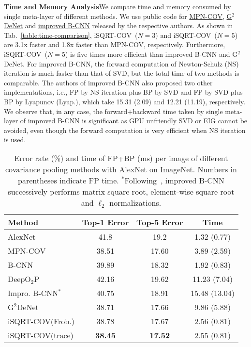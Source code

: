 \documentclass[10pt,twocolumn,letterpaper]{article}
\begin{document}
\vspace{4pt}\noindent\textbf{Time and Memory Analysis}\quad We  compare  time and memory consumed by  single meta-layer of different methods. We use  public code for \href{https://github.com/jiangtaoxie/MPN-COV-ConvNet}{MPN-COV},  \href{http://www.peihuali.org/publications/G2DeNet/G2DeNet-FGVC-v1.0.zip}{G$^{2}$DeNet} and \href{https://bitbucket.org/tsungyu/bcnn}{improved B-CNN} released by the respective authors. As shown in Tab.~\ref{table:time-comparison}, iSQRT-COV~($N=3$) and iSQRT-COV~($N=5$) are 3.1x faster and 1.8x faster than MPN-COV, respectively. Furthermore, iSQRT-COV~($N=5$) is  five  times more efficient than  improved B-CNN and G$^2$DeNet. For improved B-CNN, the forward computation of Newton-Schulz (NS) iteration is much faster than that of SVD, but the total time of two methods is comparable. The authors of improved B-CNN  also proposed two other implementations, i.e.,  FP by NS iteration plus BP by SVD and FP by SVD plus BP by Lyapunov (Lyap.), which take 15.31 (2.09) and 12.21 (11.19), respectively. We observe that, in any case, the forward$+$backward time taken by  single meta-layer of improved B-CNN is significant  as GPU unfriendly SVD or EIG cannot be avoided, even though the forward computation is very  efficient when NS iteration is used. 
\begin{table}[t]
\setlength\tabcolsep{4pt}
	\renewcommand{\baselinestretch}{1.05}
\footnotesize
	\centering
\begin{minipage}[t]{1.0\linewidth}
		\centering
		\begin{tabular}{|l|c|c|c|}
			\hline
			Method & Top-1 Error   &  Top-5 Error  & Time \\
			\hline
			\hline
			AlexNet~\cite{Krizhevsky2012ImageNet}       &  41.8     & 19.2  &  1.32 (0.77) \\
			\hline
			MPN-COV~\cite{Li_2017_ICCV}                           &  38.51 & 17.60 & 3.89 (2.59)\\
			B-CNN~\cite{lin2015bilinear}          &  39.89 & 18.32 & 1.92 (0.83)\\
			DeepO$_{2}$P~\cite{Ionescu_2015_ICCV} &  42.16 & 19.62  & 11.23 (7.04)\\
			Impro. B-CNN$^{*}$\cite{lin2017improved}     & 40.75         &  18.91  &  15.48 (13.04)  \\
			G$^2$DeNet~\cite{Wang_2017_CVPR}      &    38.71      & 17.66     &  9.86 (5.88) \\
			\hline
			\hline
			iSQRT-COV(Frob.)   &  38.78 &  17.67  & 2.56 (0.81)\\
			iSQRT-COV(trace) &  \textbf{38.45} &  \textbf{17.52} & 2.55 (0.81) \\
			\hline
		\end{tabular}
	\end{minipage}
	\renewcommand{\baselinestretch}{1.0}
	\caption{Error rate (\%) and time of FP+BP (ms) per image of different covariance pooling methods with AlexNet on ImageNet. Numbers in parentheses indicate FP time.  $^{*}$Following~\cite{lin2017improved}, improved B-CNN  successively  performs matrix square root, element-wise square root and $\ell_{2}$ normalizations.}
	\label{table:second-order-AlexNet}
\end{table}
\end{document}
